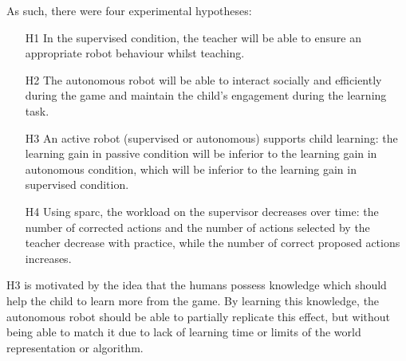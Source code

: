 
As such, there were four experimental hypotheses:
\begin{itemize}
	\item [H1] In the supervised condition, the teacher will be able to ensure an appropriate robot behaviour whilst teaching.
	\item [H2] The autonomous robot will be able to interact socially and efficiently during the game and maintain the child's engagement during the learning task.
	\item [H3] An active robot (supervised or autonomous) supports child learning: the learning gain in passive condition will be inferior to the learning gain in autonomous condition, which will be inferior to the learning gain in supervised condition.
	\item [H4] Using \gls{sparc}, the workload on the supervisor decreases over time: the number of corrected actions and the number of actions selected  by the teacher decrease with practice, while the number of correct proposed actions increases.
\end{itemize}

H3 is motivated by the idea that the humans possess knowledge which should help the child to learn more from the game. By learning this knowledge, the autonomous robot should be able to partially replicate this effect, but without being able to match it due to lack of learning time or limits of the world representation or algorithm.

